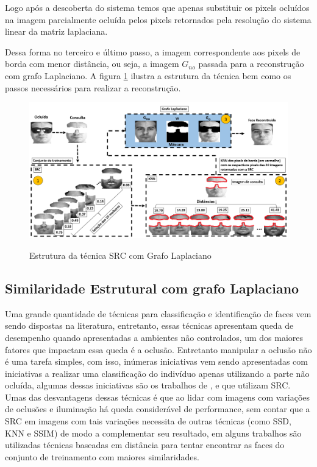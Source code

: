  Logo após a descoberta do sistema temos que apenas substituir os pixels ocluídos na imagem parcialmente ocluída pelos pixels retornados pela resolução do sistema linear da matriz laplaciana.



Dessa forma no terceiro e último passo, a imagem correspondente aos pixels de borda com menor distância, ou seja, a imagem $G_{no}$ passada para a reconstrução com grafo Laplaciano. A figura \ref{fig:estrutura_src_gl} ilustra a estrutura da técnica bem como os passos necessários para realizar a reconstrução.


\begin{figure}[H]
\centering
\caption{Estrutura da técnica SRC com Grafo Laplaciano}
\includegraphics[scale = 0.40]{imgs4/estrutura/estrutura_src_gl}
\label{fig:estrutura_src_gl}
\end{figure}


\subsection{Similaridade Estrutural com grafo Laplaciano}
\label{sec:ssim_gl}


Uma grande quantidade de técnicas para classificação e identificação de faces vem sendo dispostas na literatura, entretanto, essas técnicas apresentam queda de desempenho quando apresentadas a ambientes não controlados, um dos maiores fatores que impactam essa queda é a oclusão. Entretanto manipular a oclusão não é uma tarefa simples, com isso, inúmeras iniciativas vem sendo apresentadas com iniciativas a realizar uma classificação do indivíduo apenas utilizando a parte não ocluída, algumas dessas iniciativas são os trabalhos de , e  que utilizam SRC. Umas das desvantagens dessas técnicas é que ao lidar com imagens com variações de oclusões e iluminação há queda considerável de performance, sem contar que a SRC em imagens com tais variações necessita de outras técnicas (como SSD, KNN e SSIM) de modo a complementar seu resultado, em alguns trabalhos são utilizadas técnicas baseadas em distância para tentar encontrar as faces do conjunto de treinamento com maiores similaridades.


